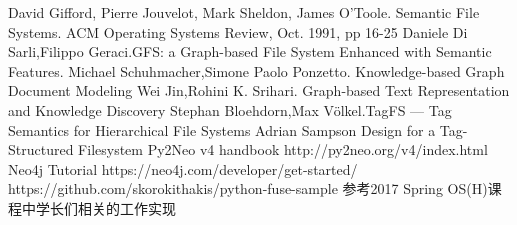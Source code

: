 \documentclass[UTF8]{ctexart}
\begin{document}
\begin{thebibliography}{99}
\bibitem{} David Gifford, Pierre Jouvelot, Mark Sheldon, James O’Toole.    	Semantic File Systems. ACM Operating Systems Review, Oct. 1991, pp 16-25
\bibitem{} Daniele Di Sarli,Filippo Geraci.GFS: a Graph-based File System Enhanced with Semantic Features.
\bibitem{} Michael Schuhmacher,Simone Paolo Ponzetto. Knowledge-based Graph Document Modeling
\bibitem{} Wei Jin,Rohini K. Srihari.	Graph-based Text Representation and Knowledge Discovery
\bibitem{} Stephan Bloehdorn,Max Völkel.TagFS — Tag Semantics for Hierarchical File Systems
\bibitem{} Adrian Sampson Design for a Tag-Structured Filesystem
\bibitem{} Py2Neo v4 handbook http://py2neo.org/v4/index.html
\bibitem{} Neo4j Tutorial https://neo4j.com/developer/get-started/
\bibitem{} https://github.com/skorokithakis/python-fuse-sample
\bibitem{} 参考2017 Spring OS(H)课程中学长们相关的工作实现
\end{thebibliography}
\end{document}
